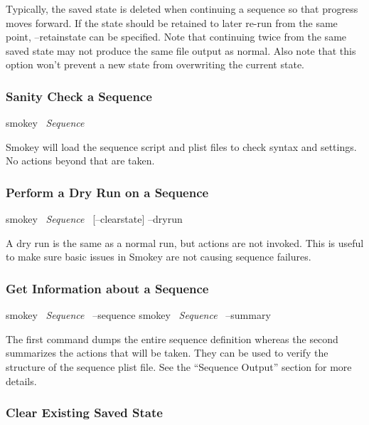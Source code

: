 \documentclass[11pt]{article}
\makeatletter
\newcommand{\iftt}[1]{\ifthenelse{\equal{\f@family}{\ttdefault}}{#1}{}}
\newcommand{\param}[1]{{\iftt{\bfseries}{}\itshape#1}}
\newcommand{\keyword}[1]{\mbox{\ttfamily#1}}
\makeatother
\begin{document}
Typically, the saved state is deleted when continuing a sequence so that
progress moves forward.  If the state should be retained to later re-run from
the same point, \keyword{--retainstate} can be specified.  Note that continuing twice
from the same saved state may not produce the same file output as normal.  Also
note that this option won't prevent a new state from overwriting the current
state.

\subsubsection{Sanity Check a Sequence}

\begin{CommandLine}
smokey ~\param{Sequence}~
\end{CommandLine}

Smokey will load the sequence script and plist files to check syntax and
settings.  No actions beyond that are taken.

\subsubsection{Perform a Dry Run on a Sequence}

\begin{CommandLine}
smokey ~\param{Sequence}~ [--clearstate] --dryrun
\end{CommandLine}

A dry run is the same as a normal run, but actions are not invoked.  This is
useful to make sure basic issues in Smokey are not causing sequence failures.

\subsubsection{Get Information about a Sequence}

\begin{CommandLine}
smokey ~\param{Sequence}~ --sequence
smokey ~\param{Sequence}~ --summary
\end{CommandLine}

The first command dumps the entire sequence definition whereas the second
summarizes the actions that will be taken.  They can be used to verify the
structure of the sequence plist file.  See the ``Sequence Output'' section for
more details.

\subsubsection{Clear Existing Saved State}
\end{document}
